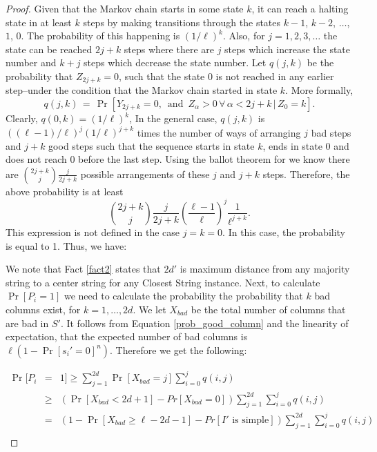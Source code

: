 \begin{proof}
Given that the Markov chain starts in some state $k$, it can reach a halting state in at least $k$ steps by making transitions through the states $k - 1$, $k - 2$, $\ldots$, $1$, $0$.  The probability of this happening is $(1/\ell)^k$.  Also, for $j = 1, 2, 3, \ldots$ the state can be reached $2j + k$ steps where there are $j$ steps which increase the state number and $k + j$  steps which decrease the state number.  Let $q(j,k)$ be the probability that $Z_{2j + k} = 0$, such that the state 0 is not reached  in any earlier step--under the condition that the Markov chain started in state $k$.  More formally,  $$q(j, k) \, =  \, \Pr[Y_{2j+k} = 0, \, \mbox{ and } \, Z_{\alpha} > 0 \, \forall \, \alpha < 2j + k \, | \, Z_0 = k ].$$ Clearly, $q(0, k) = (1/\ell)^k$,  In the general case, $q(j, k)$ is $((\ell - 1)/\ell)^j (1/\ell)^{j + k}$ times the number of ways of arranging $j$ bad steps and $j + k$ good steps such that the sequence starts in state $k$, ends in state 0 and does not reach 0 before the last step. Using the ballot theorem \cite{ballot_thm} for we know there are ${{2j + k}\choose{j}}\frac{j}{2j +k}$ possible arrangements of these $j$ and $j + k$ steps. Therefore, the above probability is at least $${{2j + k}\choose{j}}\frac{j}{2j +k} \left( \frac{\ell - 1}{\ell}\right)^{j} \frac{1}{\ell^{j + k}}.$$ This expression is not defined in the case $j = k = 0$.  In this case, the probability is equal to 1.  Thus, we have: 

We note that Fact \ref{fact2} states that $2d'$ is maximum distance from any majority string to a center string for any {\sc Closest String} instance.   Next, to calculate $\Pr[P_i = 1]$ we need to calculate the probability the probability that $k$ bad columns exist, for $k = 1, \ldots, 2d$. We let $X_{bad}$ be the total number of columns that are bad in $S'$. It follows from Equation \ref{prob_good_column} and the linearity of expectation, that the expected number of bad columns is $\ell(1 - \Pr[s_i' =0]^n)$.  Therefore we get the following:
  
\begin{eqnarray*}
\Pr[P_i & = & 1] 		 \geq  \sum_{j = 1}^{2d} \Pr[X_{bad} = j]\sum_{i = 0}^j q(i,j) \\
						& \geq &  \left( \Pr[X_{bad} < 2d +1] - Pr[X_{bad} = 0] \right) \sum_{j = 1}^{2d} \sum_{i = 0}^j q(i,j) \\
					 	& = & \left( 1 - \Pr[X_{bad} \geq \ell - 2d - 1] - Pr[I' \mbox{  is simple}] \right) \sum_{j = 1}^{2d} \sum_{i = 0}^j q(i,j) \\
\end{eqnarray*}


\end{proof}
